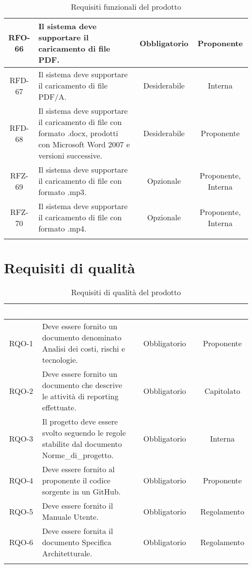 \begin{xltabular}{\textwidth}{| c | X | c | c |}
    \hline
    RFO-66 & Il sistema deve supportare il caricamento di file PDF. & Obbligatorio & Proponente \\
    \hline
    RFD-67 & Il sistema deve supportare il caricamento di file PDF/A. & Desiderabile & Interna \\
    \hline
    RFD-68 & Il sistema deve supportare il caricamento di  file con formato .docx, prodotti con Microsoft Word 2007 e versioni successive. & Desiderabile & Proponente \\
    \hline
    RFZ-69 & Il sistema deve supportare il caricamento di  file con formato .mp3. & Opzionale & Proponente, Interna \\
    \hline
    RFZ-70 & Il sistema deve supportare il caricamento di  file con formato .mp4. & Opzionale & Proponente, Interna \\
    \hline
    
    
  
     \caption{Requisiti funzionali del prodotto}
    \label{tab:reqfun}
\end{xltabular}
\endgroup
  
\section{Requisiti di qualità}

\begingroup
\setlength{\tabcolsep}{10pt}
\renewcommand{\arraystretch}{1.3}
\begin{xltabular}{\textwidth}{| c | X | c | c |}
    \hline
     \textbf{\textcolor{white}{Codice}} & \textbf{\textcolor{white}{Descrizione}} & \textbf{\textcolor{white}{Classificazione}} & \textbf{\textcolor{white}{Fonte}}\\
    \hline
    \endhead
    RQO-1 & Deve essere fornito un documento denominato Analisi dei costi, rischi e tecnologie. & Obbligatorio & Proponente \\
    \hline
    RQO-2 & Deve essere fornito un documento che descrive le attività di  reporting effettuate. & Obbligatorio & Capitolato \\
    \hline
    RQO-3 & Il progetto deve essere svolto seguendo le regole stabilite dal documento Norme\_di\_progetto. & Obbligatorio & Interna \\
    \hline
    RQO-4 & Deve essere fornito al proponente il codice sorgente in un  GitHub. & Obbligatorio & Proponente \\
    \hline
    RQO-5 & Deve essere fornito il Manuale Utente. & Obbligatorio & Regolamento \\
    \hline
    RQO-6 & Deve essere fornita il documento Specifica Architetturale. & Obbligatorio & Regolamento \\
    \hline
     \caption{Requisiti di qualità del prodotto}
    \label{tab:reqqua}
\end{xltabular}
\endgroup
\newpage
